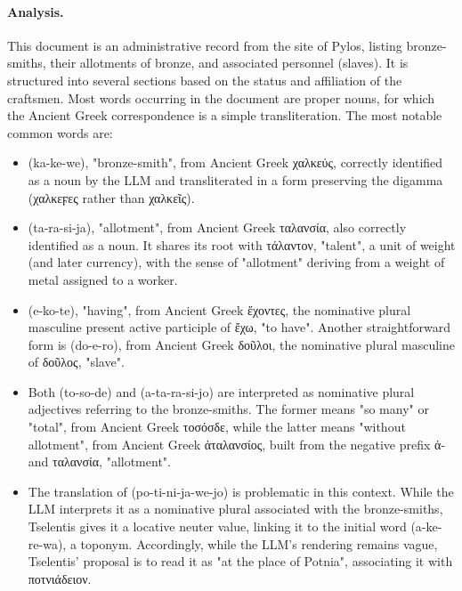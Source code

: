 \paragraph{Analysis.}
This document is an administrative record from the site of Pylos, listing bronze-smiths, their allotments of bronze, and associated personnel (slaves).
It is structured into several sections based on the status and affiliation of the craftsmen.
Most words occurring in the document are proper nouns, for which the Ancient Greek correspondence is a simple transliteration.
The most notable common words are:
\begin{itemize}
\item \textlinb{\Bka\Bke\Bwe} (ka-ke-we), "bronze-smith", from Ancient Greek \textgreek{χαλκεύς}, correctly identified as a noun by the LLM and transliterated in a form preserving the digamma (\textgreek{χαλκεϝες} rather than \textgreek{χαλκεῖς}).
\item \textlinb{\Bta\Bra\Bsi\Bja} (ta-ra-si-ja), "allotment", from Ancient Greek \textgreek{ταλανσία}, also correctly identified as a noun.
It shares its root with \textgreek{τάλαντον}, "talent", a unit of weight (and later currency), with the sense of "allotment" deriving from a weight of metal assigned to a worker.
\item \textlinb{\Be\Bko\Bte} (e-ko-te), "having", from Ancient Greek \textgreek{ἔχοντες}, the nominative plural masculine present active participle of \textgreek{ἔχω}, "to have".
Another straightforward form is \textlinb{\Bdo\Be\Bro} (do-e-ro), from Ancient Greek \textgreek{δοῦλοι}, the nominative plural masculine of \textgreek{δοῦλος}, "slave".
\item Both \textlinb{\Bto\Bso\Bde} (to-so-de) and \textlinb{\Ba\Bta\Bra\Bsi\Bjo} (a-ta-ra-si-jo) are interpreted as nominative plural adjectives referring to the bronze-smiths.
The former means "so many" or "total", from Ancient Greek \textgreek{τοσόσδε}, while the latter means "without allotment", from Ancient Greek \textgreek{ἀταλανσίος}, built from the negative prefix \textgreek{ἀ-} and \textgreek{ταλανσία}, "allotment".
\item The translation of \textlinb{\Bpo\Bti\Bni\Bja\Bwe\Bjo} (po-ti-ni-ja-we-jo) is problematic in this context.
While the LLM interprets it as a nominative plural associated with the bronze-smiths, Tselentis gives it a locative neuter value, linking it to the initial word \textlinb{\Ba\Bke\Bre\Bwa} (a-ke-re-wa), a toponym.
Accordingly, while the LLM's rendering remains vague, Tselentis' proposal is to read it as "at the place of Potnia", associating it with \textgreek{ποτνιάδειον}.
\end{itemize}

